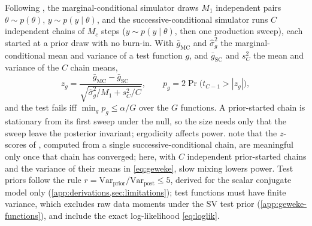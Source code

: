 Following \citet{geweke2004getting}, the marginal-conditional simulator draws $M_1$ independent
pairs $\theta \sim p(\theta)$, $y \sim p(y \mid \theta)$, and the successive-conditional simulator
runs $C$ independent chains of $M_c$ steps ($y \sim p(y \mid \theta)$, then one production sweep),
each started at a prior draw with no burn-in. With
$\bar g_{\mathrm{MC}}$ and $\hat\sigma^2_g$ the marginal-conditional mean and variance of a test
function $g$, and $\bar g_{\mathrm{SC}}$ and $s^2_C$ the mean and variance of the $C$ chain means,
\begin{equation}\label{eq:geweke}
  z_g = \frac{\bar g_{\mathrm{MC}} - \bar g_{\mathrm{SC}}}{\sqrt{\hat\sigma^2_g/M_1 + s^2_C/C}},
  \qquad p_g = 2\Pr\bigl(t_{C-1} > |z_g|\bigr),
\end{equation}
and the test fails iff $\min_g p_g \le \alpha/G$ over the $G$ functions. %
A prior-started chain is stationary from its first sweep under the null, so the size needs only
that the sweep leave the posterior invariant; ergodicity affects power.
\citet[Section~3]{talts2018validating} note that the $z$-scores of \citet{geweke2004getting},
computed from a single successive-conditional chain, are meaningful only once that chain has
converged; here, with $C$ independent prior-started chains and the variance of their means in
\eqref{eq:geweke}, slow mixing lowers power.
Test priors follow the rule $r = \mathrm{Var}_{\mathrm{prior}}/\mathrm{Var}_{\mathrm{post}} \le 5$,
derived for the scalar conjugate model only (\cref{app:derivations,sec:limitations}); %
test functions must have finite variance, which excludes raw data moments under the SV test prior
(\cref{app:geweke-functions}), and include the exact log-likelihood \eqref{eq:loglik}. %
